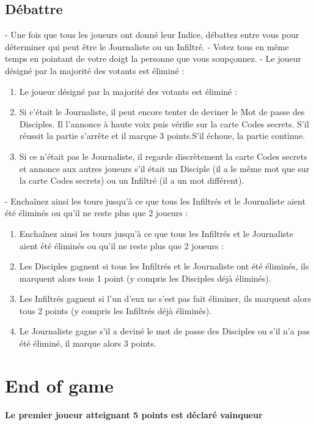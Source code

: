 \documentclass{article}%
\begin{document}
%
\subsection{ Débattre
}%
\label{subsec:Dbattre}%
{-} Une fois que tous les joueurs ont donné leur Indice, débattez entre vous pour déterminer qui peut être le Journaliste ou un Infiltré.
%
{-} Votez tous en même temps en pointant de votre doigt la personne que vous soupçonnez.
%
{-} Le joueur désigné par la majorité des votants est éliminé :
%
\begin{enumerate}%
\item%
Le joueur désigné par la majorité des votants est éliminé :
%
\item%
 Si c’était le Journaliste, il peut encore tenter de deviner le Mot de passe des Disciples. Il l'annonce à haute voix puis vérifie sur la carte Codes secrets. S’il réussit la partie s’arrête et il marque 3 points.S’il échoue, la partie continue.
%
\item%
 Si ce n’était pas le Journaliste, il regarde discrètement la carte Codes secrets et annonce aux autres joueurs s’il était un Disciple (il a le même mot que sur la carte Codes secrets) ou un Infiltré (il a un mot différent).
%
\end{enumerate}%
{-} Enchaînez ainsi les tours jusqu’à ce que tous les Infiltrés et le Journaliste aient été éliminés ou qu’il ne reste plus que 2 joueurs :
%
\begin{enumerate}%
\item%
Enchaînez ainsi les tours jusqu’à ce que tous les Infiltrés et le Journaliste aient été éliminés ou qu’il ne reste plus que 2 joueurs :
%
\item%
 Les Disciples gagnent si tous les Infiltrés et le Journaliste ont été éliminés, ils marquent alors tous 1 point (y compris les Disciples déjà éliminés).
%
\item%
 Les Infiltrés gagnent si l'un d'eux ne s'est pas fait éliminer, ils marquent alors tous 2 points (y compris les Infiltrés déjà éliminés).
%
\item%
 Le Journaliste gagne s'il a deviné le mot de passe des Disciples ou s'il n'a pas été éliminé, il marque alors 3 points.
%
\end{enumerate}

%
\section{ End of game
}%
\label{sec:Endofgame}%
\textbf{Le premier joueur atteignant 5 points est déclaré vainqueur}

%
\end{document}
